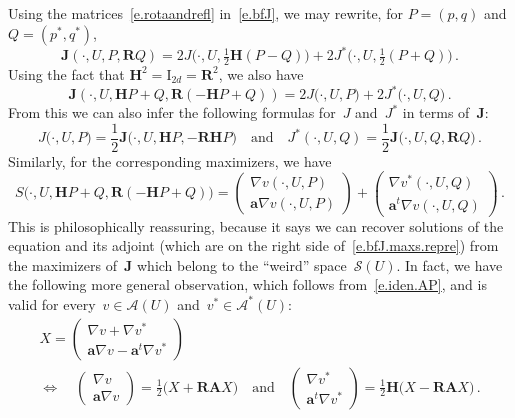 \documentclass[11pt]{article} %
\numberwithin{equation}{section}
\theoremstyle{definition}
\newcommand{\qand}{\quad \mbox{and} \quad }
\renewcommand{\a}{\mathbf{a}}
\newcommand{\A}{\mathcal{A}}
\newcommand{\bfA}{\mathbf{A}}
\newcommand{\bfJ}{\mathbf{J}}
\newcommand{\rota}{\mathbf{R}}
\newcommand{\refl}{\mathbf{H}}
\begin{document}
Using the matrices~\eqref{e.rotaandrefl} in~\eqref{e.bfJ}, we may rewrite, for $P = (p,q)$ and $Q = (p^*,q^*)$,
\begin{equation}  \label{e.bfJ.matrix}
\bfJ(\cdot,U,P,\rota Q) 
=
2J \bigl(\cdot,U,\tfrac12 \refl( P -  Q)\bigr) 
+
2J^* \bigl(\cdot,U,\tfrac12(P +  Q)\bigr)
\,. 
\end{equation}
Using the fact that $\refl^2 = \mathrm{I}_{2d} = \rota^2$, we also have
\begin{equation} \label{e.bfJ.matrix2}
\bfJ(\cdot,U,\refl P + Q,  \rota (-\refl P + Q)) 
=
2J \bigl(\cdot,U,P\bigr) 
+
2J^* \bigl(\cdot,U,Q\bigr)
\,.
\end{equation}
From this we can also infer the following formulas for~$J$ and~$J^*$ in terms of~$\bfJ$:
\begin{equation}  \label{e.bfJ.matrix3}
J \bigl(\cdot,U,P\bigr) 
= \frac12 \bfJ\bigl(\cdot,U,\refl P,  - \rota \refl P\bigr) 
\qand
J^*(\cdot,U,Q)
= 
\frac12 \bfJ\bigl(\cdot,U,Q, \rota Q\bigr) \,.
\end{equation}
Similarly, for the corresponding maximizers, we have
\begin{equation}  \label{e.bfJ.maxs.repre}
S\bigl(\cdot,U,\refl P + Q,  \rota (-\refl P + Q)\bigr) = 
 \begin{pmatrix} \nabla v(\cdot,U,P) \\ \a \nabla v(\cdot,U,P) \end{pmatrix} 
 + 
 \begin{pmatrix} \nabla v^*(\cdot,U,Q) \\ \a^t \nabla v(\cdot,U,Q) \end{pmatrix}
 \,.
\end{equation}
This is philosophically reassuring, because it says we can recover solutions of the equation and its adjoint (which are on the right side of~\eqref{e.bfJ.maxs.repre}) from the maximizers of~$\bfJ$ which belong to the ``weird'' space~$\mathcal{S}(U)$.
In fact, we have the following more general observation, which follows from~\eqref{e.iden.AP}, and is valid for every~$v \in \A(U)$ and~$v^* \in \A^*(U)$:
\begin{multline} \label{e.splittingformula.for.X}
X = 
\begin{pmatrix} \nabla v + \nabla v^* \\ \a \nabla v - \a^t \nabla v^* \end{pmatrix} 
\\
\Longleftrightarrow \quad
 \begin{pmatrix} \nabla v \\ \a \nabla v \end{pmatrix} = \frac12 \bigl( X + \rota \bfA X \bigr) 
\qand
  \begin{pmatrix} \nabla v^* \\ \a^t \nabla v^* \end{pmatrix} = \frac12 \refl \bigl( X - \rota \bfA X \bigr) 
\,.
\end{multline}
\end{document}
